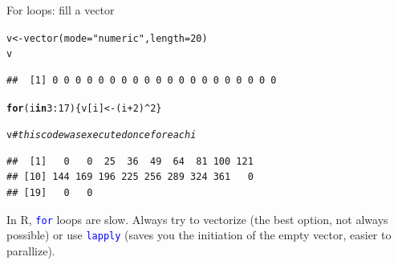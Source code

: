 \documentclass[xcolor=table,      handout ,    xcolor=dvipsnames]{beamer}\usepackage[]{graphicx}\usepackage[]{color}
\makeatletter
\newcommand{\hlnum}[1]{\textcolor[rgb]{0,0,0}{#1}}
\newcommand{\hlstr}[1]{\textcolor[rgb]{0.545,0.137,0.137}{#1}}
\newcommand{\hlcom}[1]{\textcolor[rgb]{0,0.392,0}{\textit{#1}}}
\newcommand{\hlopt}[1]{\textcolor[rgb]{0,0,0}{#1}}
\newcommand{\hlstd}[1]{\textcolor[rgb]{0,0,0}{#1}}
\newcommand{\hlkwa}[1]{\textcolor[rgb]{1,0,0}{\textbf{#1}}}
\newcommand{\hlkwb}[1]{\textcolor[rgb]{0,0,0}{#1}}
\newcommand{\hlkwc}[1]{\textcolor[rgb]{1,0,1}{#1}}
\newcommand{\hlkwd}[1]{\textcolor[rgb]{0,0,1}{#1}}
\newenvironment{kframe}{%
 \def\at@end@of@kframe{}%
 \ifinner\ifhmode%
  \def\at@end@of@kframe{\end{minipage}}%
  \begin{minipage}{\columnwidth}%
 \fi\fi%
 \def\FrameCommand##1{\hskip\@totalleftmargin \hskip-\fboxsep
 \colorbox{shadecolor}{##1}\hskip-\fboxsep
     \hskip-\linewidth \hskip-\@totalleftmargin \hskip\columnwidth}%
 \MakeFramed {\advance\hsize-\width
   \@totalleftmargin\z@ \linewidth\hsize
   \@setminipage}}%
 {\par\unskip\endMakeFramed%
 \at@end@of@kframe}
\newenvironment{knitrout}{}{} %
\newcommand{\rcode}[1]{\texttt{\textcolor{Blue}{#1}}}
\makeatother
\begin{document}

\begin{frame}[fragile]{For loops: fill a vector}
\begin{knitrout}
\color{fgcolor}\begin{kframe}
\begin{alltt}
\hlstd{v} \hlkwb{<-} \hlkwd{vector}\hlstd{(}\hlkwc{mode}\hlstd{=}\hlstr{"numeric"}\hlstd{,} \hlkwc{length}\hlstd{=}\hlnum{20}\hlstd{)}
\hlstd{v}
\end{alltt}
\begin{verbatim}
##  [1] 0 0 0 0 0 0 0 0 0 0 0 0 0 0 0 0 0 0 0 0
\end{verbatim}
\end{kframe}
\end{knitrout}
\pause \vspace{-1em}
\begin{knitrout}
\color{fgcolor}\begin{kframe}
\begin{alltt}
\hlkwa{for}\hlstd{(i} \hlkwa{in} \hlnum{3}\hlopt{:}\hlnum{17}\hlstd{)  \{  v[i]} \hlkwb{<-} \hlstd{(i}\hlopt{+}\hlnum{2}\hlstd{)}\hlopt{^}\hlnum{2}  \hlstd{\}}
\end{alltt}
\end{kframe}
\end{knitrout}
\pause \vspace{-1em}
\begin{knitrout}
\color{fgcolor}\begin{kframe}
\begin{alltt}
\hlstd{v} \hlcom{# this code was executed once for each i}
\end{alltt}
\begin{verbatim}
##  [1]   0   0  25  36  49  64  81 100 121
## [10] 144 169 196 225 256 289 324 361   0
## [19]   0   0
\end{verbatim}
\end{kframe}
\end{knitrout}
\pause \vspace{-0.5em}
In R, \rcode{for} loops are slow. Always try to vectorize (the best option, not always possible) or use \rcode{lapply} (saves you the initiation of the empty vector, easier to parallize).
\end{frame}

\end{document}
